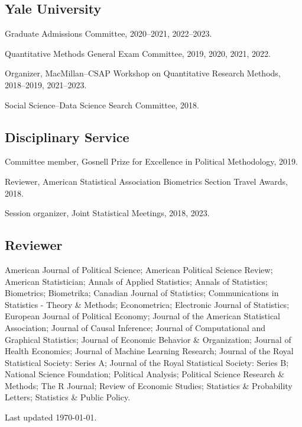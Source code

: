 \documentclass[10pt,letterpaper]{article}
\newenvironment{infolist}{
	\begin{list}{}{
		\setlength{\parskip}{0pt}
		\setlength{\itemsep}{4pt}
		\setlength{\parsep}{0.3em}
		\setlength{\leftmargin}{0em}
		\setlength{\labelwidth}{0em}
		}
	}{
\end{list}
}
\newcommand{\infoitem}[1]{\item {#1}}
\begin{document}
	\subsection*{Yale University}

	\begin{infolist}
		\infoitem{Graduate Admissions Committee, 2020--2021, 2022--2023.}
		\infoitem{Quantitative Methods General Exam Committee, 2019, 2020, 2021, 2022.}
		\infoitem{Organizer, MacMillan--CSAP Workshop on Quantitative Research Methods, 2018--2019, 2021--2023.}
		\infoitem{Social Science--Data Science Search Committee, 2018.}
	\end{infolist}

	\subsection*{Disciplinary Service}

	\begin{infolist}
		\infoitem{Committee member, Gosnell Prize for Excellence in Political Methodology, 2019.}
		\infoitem{Reviewer, American Statistical Association Biometrics Section Travel Awards, 2018.}
		\infoitem{Session organizer, Joint Statistical Meetings, 2018, 2023.}
	\end{infolist}

	\subsection*{Reviewer}

	\begin{infolist}
		\infoitem{American Journal of Political Science; American Political Science Review; American Statistician; Annals of Applied Statistics; Annals of Statistics; Biometrics; Biometrika; Canadian Journal of Statistics; Communications in Statistics - Theory \& Methods; Econometrica; Electronic Journal of Statistics; European Journal of Political Economy; Journal of the American Statistical Association; Journal of Causal Inference; Journal of Computational and Graphical Statistics; Journal of Economic Behavior \& Organization; Journal of Health Economics; Journal of Machine Learning Research; Journal of the Royal Statistical Society: Series A; Journal of the Royal Statistical Society: Series B; National Science Foundation; Political Analysis; Political Science Research \& Methods; The R Journal; Review of Economic Studies; Statistics \& Probability Letters; Statistics \& Public Policy.}
	\end{infolist}

	\bigskip
	{\small Last updated \today.}
\end{document}
